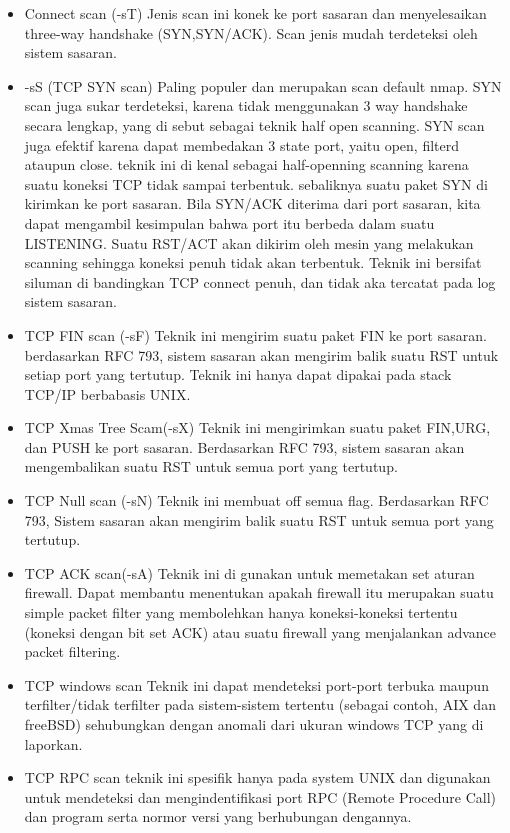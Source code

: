  \begin{itemize}
   \item Connect scan (-sT)
         Jenis scan ini konek ke port sasaran dan menyelesaikan three-way handshake (SYN,SYN/ACK). Scan jenis mudah terdeteksi oleh sistem sasaran.
   \item -sS (TCP SYN scan)
          Paling populer dan merupakan scan default nmap. SYN scan juga sukar terdeteksi, karena tidak menggunakan 3 way handshake secara lengkap, yang di sebut sebagai teknik half open scanning. SYN scan juga efektif karena dapat membedakan 3 state port, yaitu open, filterd ataupun close. teknik ini di kenal sebagai half-openning scanning karena suatu koneksi TCP tidak sampai terbentuk. sebaliknya suatu paket SYN di kirimkan ke port sasaran. Bila SYN/ACK diterima dari port sasaran, kita dapat mengambil kesimpulan bahwa port itu berbeda dalam suatu LISTENING. Suatu RST/ACT akan dikirim oleh mesin yang melakukan scanning sehingga koneksi penuh tidak akan terbentuk. Teknik ini bersifat siluman di bandingkan TCP connect penuh, dan tidak aka tercatat pada log sistem sasaran.
   \item TCP FIN scan (-sF)
         Teknik ini mengirim suatu paket FIN ke port sasaran. berdasarkan RFC 793, sistem sasaran akan mengirim balik suatu RST untuk setiap port yang tertutup. Teknik ini hanya dapat dipakai pada stack TCP/IP berbabasis UNIX.
   \item TCP Xmas Tree Scam(-sX)
         Teknik ini mengirimkan suatu paket FIN,URG, dan PUSH ke port sasaran. Berdasarkan RFC 793, sistem sasaran akan mengembalikan suatu RST untuk semua port yang tertutup.
   \item TCP Null scan (-sN)
         Teknik ini membuat off semua flag. Berdasarkan RFC 793, Sistem sasaran akan mengirim balik suatu RST untuk semua port yang tertutup.
   \item TCP ACK scan(-sA)
         Teknik ini di gunakan untuk memetakan set aturan firewall. Dapat membantu menentukan apakah firewall itu merupakan suatu simple packet filter yang membolehkan hanya koneksi-koneksi tertentu (koneksi dengan bit set ACK) atau suatu firewall yang menjalankan advance packet filtering.
   \item TCP windows scan
         Teknik ini dapat mendeteksi port-port terbuka maupun terfilter/tidak terfilter pada sistem-sistem tertentu (sebagai contoh, AIX dan freeBSD) sehubungkan dengan anomali dari ukuran windows TCP yang di laporkan.
   \item TCP RPC scan
         teknik ini spesifik hanya pada system UNIX dan digunakan untuk mendeteksi dan mengindentifikasi port RPC (Remote Procedure Call) dan program serta normor versi yang berhubungan dengannya.

\end{itemize}

